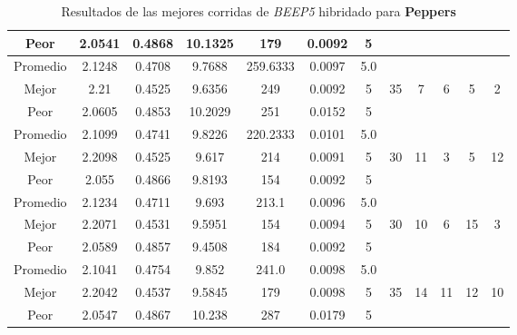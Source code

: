 \begin{table}[h!]
\begin{center}
\begin{tabular}{|c|c|c|c|c|c|c|c|c|c|c|c|}
            \cline{1-7}
            Peor & 2.0541 & 0.4868  & 10.1325 & 179 & 0.0092 & 5 &  &  &  &  & \\
        \hline
        \hline
            Promedio  & 2.1248 & 0.4708 & 9.7688 & 259.6333 & 0.0097 & 5.0 &  &  &  &  & \\
            \cline{1-7}
            Mejor & 2.21 & 0.4525  & 9.6356 & 249 & 0.0092 & 5 & 35 & 7 & 6 & 5 & 2\\
            \cline{1-7}
            Peor & 2.0605 & 0.4853  & 10.2029 & 251 & 0.0152 & 5 &  &  &  &  & \\
        \hline
        \hline
            Promedio  & 2.1099 & 0.4741 & 9.8226 & 220.2333 & 0.0101 & 5.0 &  &  &  &  & \\
            \cline{1-7}
            Mejor & 2.2098 & 0.4525  & 9.617 & 214 & 0.0091 & 5 & 30 & 11 & 3 & 5 & 12\\
            \cline{1-7}
            Peor & 2.055 & 0.4866  & 9.8193 & 154 & 0.0092 & 5 &  &  &  &  & \\
        \hline
        \hline
            Promedio  & 2.1234 & 0.4711 & 9.693 & 213.1 & 0.0096 & 5.0 &  &  &  &  & \\
            \cline{1-7}
            Mejor & 2.2071 & 0.4531  & 9.5951 & 154 & 0.0094 & 5 & 30 & 10 & 6 & 15 & 3\\
            \cline{1-7}
            Peor & 2.0589 & 0.4857  & 9.4508 & 184 & 0.0092 & 5 &  &  &  &  & \\
        \hline
        \hline
            Promedio  & 2.1041 & 0.4754 & 9.852 & 241.0 & 0.0098 & 5.0 &  &  &  &  & \\
            \cline{1-7}
            Mejor & 2.2042 & 0.4537  & 9.5845 & 179 & 0.0098 & 5 & 35 & 14 & 11 & 12 & 10\\
            \cline{1-7}
            Peor & 2.0547 & 0.4867  & 10.238 & 287 & 0.0179 & 5 &  &  &  &  & \\
        \hline
        \end{tabular}
        \caption{Resultados de las mejores corridas de \emph{BEEP5} hibridado para {\bf Peppers}}
        \label{tb:tableBEEP5}
    \end{center}
\end{table}
